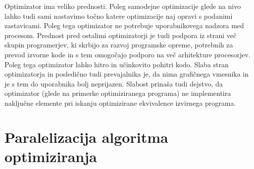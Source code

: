 \documentclass[a4paper, 12pt]{book}
\begin{document}
Optimizator ima veliko prednosti. Poleg samodejne optimizacije glede na nivo lahko tudi sami nastavimo točno katere optimizacije naj opravi s podanimi zastavicami. Poleg tega optimizator ne potrebuje uporabnikovega nadzora med procesom. Prednost pred ostalimi optimizatorji je tudi podpora iz strani več skupin programerjev, ki skrbijo za razvoj programske opreme, potrebnih za prevod izvorne kode in s tem omogočajo podporo na več arhitekture procesorjev. Poleg tega optimizator lahko hitro in učinkovito pohitri kodo. Slaba stran optimizatorja in posledično tudi prevajalnika je, da nima grafičnega vmesnika in je s tem do uporabnika bolj neprijazen. Slabost prinaša tudi dejstvo, da optimizator (glede na primerke optimiziranega programa) ne implementira naključne elemente pri iskanju optimizirane ekvivalence izvirnega programa.

\chapter{Paralelizacija algoritma optimiziranja}
\end{document}
